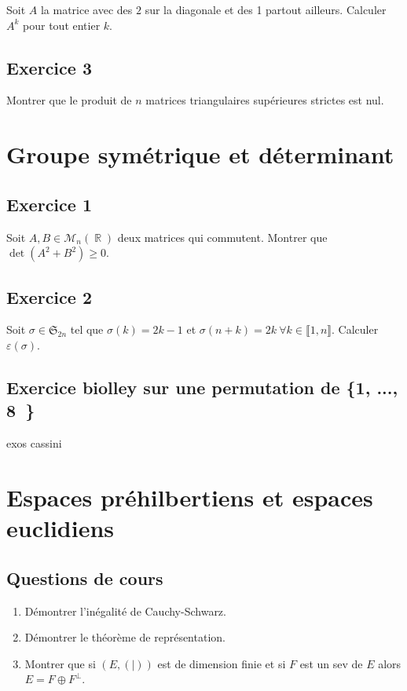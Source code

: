 \documentclass{article}
\DeclareMathOperator{\R}{\mathbb{R}}
\newcommand{\n}{\llbracket 1, n \rrbracket}
\begin{document}
Soit $A$ la matrice avec des $2$ sur la diagonale et des 1 partout ailleurs. Calculer $A^k$ pour tout entier $k$. 

\subsection*{Exercice 3} 

Montrer que le produit de $n$ matrices triangulaires supérieures strictes est nul. 

\clearpage

\section{Groupe symétrique et déterminant} 

\subsection*{Exercice 1} 

Soit $A, B \in \mathcal{M}_n(\R)$ deux matrices qui commutent. Montrer que $\det(A^2 + B^2) \geqslant 0$. 

\subsection*{Exercice 2} 

Soit $\sigma \in \mathfrak{S}_{2n} $ tel que $\sigma(k) = 2k - 1$ et $\sigma(n+k) = 2k \ \forall k \in \n$. Calculer $\varepsilon(\sigma)$. 



\subsection*{Exercice biolley sur une permutation de \{1, ..., 8 \}} 

exos cassini 

\clearpage

\section{Espaces préhilbertiens et espaces euclidiens} 

\subsection*{Questions de cours}

\begin{enumerate}
   \item Démontrer l'inégalité de Cauchy-Schwarz. 
   \item Démontrer le théorème de représentation. 
   \item Montrer que si $(E, (|))$ est de dimension finie et si $F$ est un sev de $E$ alors $E = F\oplus F^{\bot}$. 
\end{enumerate}
\end{document}
